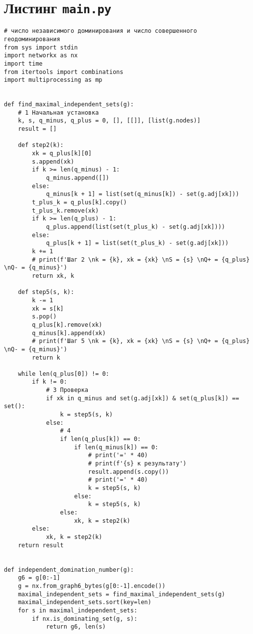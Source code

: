 \documentclass[bachelor, och, nir]{SCWorks}
\begin{document}
    \section{Листинг \texttt{main.py}}
    \begin{verbatim}
# число независимого доминирования и число совершенного геодоминирования
from sys import stdin
import networkx as nx
import time
from itertools import combinations
import multiprocessing as mp


def find_maximal_independent_sets(g):
    # 1 Начальная установка
    k, s, q_minus, q_plus = 0, [], [[]], [list(g.nodes)]
    result = []

    def step2(k):
        xk = q_plus[k][0]
        s.append(xk)
        if k >= len(q_minus) - 1:
            q_minus.append([])
        else:
            q_minus[k + 1] = list(set(q_minus[k]) - set(g.adj[xk]))
        t_plus_k = q_plus[k].copy()
        t_plus_k.remove(xk)
        if k >= len(q_plus) - 1:
            q_plus.append(list(set(t_plus_k) - set(g.adj[xk])))
        else:
            q_plus[k + 1] = list(set(t_plus_k) - set(g.adj[xk]))
        k += 1
        # print(f'Шаг 2 \nk = {k}, xk = {xk} \nS = {s} \nQ+ = {q_plus} \nQ- = {q_minus}')
        return xk, k

    def step5(s, k):
        k -= 1
        xk = s[k]
        s.pop()
        q_plus[k].remove(xk)
        q_minus[k].append(xk)
        # print(f'Шаг 5 \nk = {k}, xk = {xk} \nS = {s} \nQ+ = {q_plus} \nQ- = {q_minus}')
        return k

    while len(q_plus[0]) != 0:
        if k != 0:
            # 3 Проверка
            if xk in q_minus and set(g.adj[xk]) & set(q_plus[k]) == set():
                k = step5(s, k)
            else:
                # 4
                if len(q_plus[k]) == 0:
                    if len(q_minus[k]) == 0:
                        # print('=' * 40)
                        # print(f'{s} к результату')
                        result.append(s.copy())
                        # print('=' * 40)
                        k = step5(s, k)
                    else:
                        k = step5(s, k)
                else:
                    xk, k = step2(k)
        else:
            xk, k = step2(k)
    return result


def independent_domination_number(g):
    g6 = g[0:-1]
    g = nx.from_graph6_bytes(g[0:-1].encode())
    maximal_independent_sets = find_maximal_independent_sets(g)
    maximal_independent_sets.sort(key=len)
    for s in maximal_independent_sets:
        if nx.is_dominating_set(g, s):
            return g6, len(s)



\end{verbatim}
\end{document}
